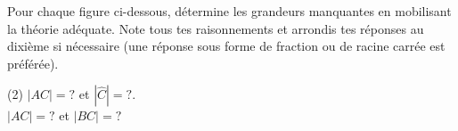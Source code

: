 \documentclass[a4paper, 12pt, parskip=half-]{scrartcl}
\begin{document}
\begin{exercise}[points=4]
    Pour chaque figure ci-dessous, détermine les grandeurs manquantes en mobilisant la théorie adéquate. Note tous tes raisonnements et arrondis tes réponses au dixième si nécessaire (une réponse sous forme de fraction ou de racine carrée est préférée).

    \begin{tasks}[after-item-skip=2cm](2)
        \task
        $|AC| = ?$ et $|\widehat{C}|=?$.\\

        \task
        $|AC|=?$ et $|BC|=?$
        \begin{center}
            
        \end{center}
    \end{tasks}
\end{exercise}
\end{document}
